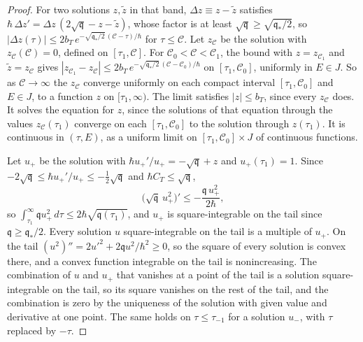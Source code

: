\documentclass[aps,prd,onecolumn,tightenlines,nofootinbib,notitlepage,11pt,floatfix]{revtex4-2}
\theoremstyle{indentedtheorem}
\begin{document}
\begin{proof}
For two solutions $z,\tilde{z}$ in that band, $\Delta z\equiv z-\tilde{z}$ satisfies $\hbar\,\Delta z'=\Delta z\,(2\sqrt{\mathfrak{q}}-z-\tilde{z})$, whose factor is at least $\sqrt{\mathfrak{q}}\geq\sqrt{\mathfrak{q}_*/2}$, so $|\Delta z(\tau)|\leq2b_T\,e^{-\sqrt{\mathfrak{q}_*/2}\,(\mathcal{C}-\tau)/\hbar}$ for $\tau\leq \mathcal{C}$. Let $z_\mathcal{C}$ be the solution with $z_\mathcal{C}(\mathcal{C})=0$, defined on $[\tau_1,\mathcal{C}]$. For $\mathcal{C}_0<\mathcal{C}<\mathcal{C}_1$, the bound with $z=z_{\mathcal{C}_1}$ and $\tilde{z}=z_\mathcal{C}$ gives $|z_{\mathcal{C}_1}-z_\mathcal{C}|\leq2b_T\,e^{-\sqrt{\mathfrak{q}_*/2}\,(\mathcal{C}-\mathcal{C}_0)/\hbar}$ on $[\tau_1,\mathcal{C}_0]$, uniformly in $E\in J$. So as $\mathcal{C}\to\infty$ the $z_\mathcal{C}$ converge uniformly on each compact interval $[\tau_1,\mathcal{C}_0]$ and $E\in J$, to a function $z$ on $[\tau_1,\infty)$. The limit satisfies $|z|\leq b_T$, since every $z_\mathcal{C}$ does. It solves the equation for $z$, since the solutions of that equation through the values $z_\mathcal{C}(\tau_1)$ converge on each $[\tau_1,\mathcal{C}_0]$ to the solution through $z(\tau_1)$. It is continuous in $(\tau,E)$, as a uniform limit on $[\tau_1,\mathcal{C}_0]\times J$ of continuous functions.

Let $u_+$ be the solution with $\hbar u_+'/u_+=-\sqrt{\mathfrak{q}}+z$ and $u_+(\tau_1)=1$. Since $-2\sqrt{\mathfrak{q}}\leq\hbar u_+'/u_+\leq-\tfrac{1}{2}\sqrt{\mathfrak{q}}$ and $\hbar C_T\leq\sqrt{\mathfrak{q}}$,
\begin{equation*}
    \big(\sqrt{\mathfrak{q}}\,u_+^2\big)' \leq -\frac{\mathfrak{q}\,u_+^2}{2\hbar} ,
\end{equation*}
so $\int_{\tau_1}^\infty\mathfrak{q}u_+^2\,d\tau\leq2\hbar\sqrt{\mathfrak{q}(\tau_1)}$, and $u_+$ is square-integrable on the tail since $\mathfrak{q}\geq\mathfrak{q}_*/2$. Every solution $u$ square-integrable on the tail is a multiple of $u_+$. On the tail $(u^2)''=2u'^2+2\mathfrak{q}u^2/\hbar^2\geq0$, so the square of every solution is convex there, and a convex function integrable on the tail is nonincreasing. The combination of $u$ and $u_+$ that vanishes at a point of the tail is a solution square-integrable on the tail, so its square vanishes on the rest of the tail, and the combination is zero by the uniqueness of the solution with given value and derivative at one point. The same holds on $\tau\leq\tau_{-1}$ for a solution $u_-$, with $\tau$ replaced by $-\tau$.


\end{proof}
\end{document}
